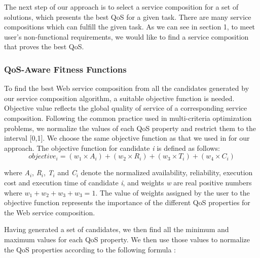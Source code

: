 The next step of our approach is to select a service composition for a set of solutions, which presents the best QoS for a given task. There are many service compositions which can fulfill the given task. As we can see in section 1, to meet  user's non-functional requirements, we would like to find a service composition that proves the best QoS.

\subsubsection {QoS-Aware Fitness Functions}

To find the best Web service composition from all the candidates generated by our service composition algorithm, a suitable objective function is needed. Objective value reflects the global quality of service of a corresponding service composition. Following the common practice \cite{4,14,19} used in multi-criteria optimization problems, we normalize the values of each QoS property and restrict them to the interval [0,1]. We choose the same objective function as that we used in \cite{4,19} for our approach. The objective function for candidate \emph{i} is defined as follows:
\begin{equation}
objective_{i}=(w_{1} \times A_{i}) + (w_{2} \times R_{i}) + (w_{3} \times T_{i}) + (w_{4} \times C_{i})
\end{equation}

where \emph{A$_{i}$}, \emph{R$_{i}$}, \emph{T$_{i}$} and  \emph{C$_{i}$} denote the normalized availability, reliability,  execution cost and  execution time of candidate \emph{i}, and weights \emph{w} are real positive numbers where $w_{1} + w_{2} + w_{3} + w_{3} = 1$. The value of weights assigned by the user to the objective function represents the importance of the different QoS properties for the Web service composition. \par

Having generated a set of candidates, we then find all the minimum and maximum values for each QoS property. We then use those values to normalize the QoS properties according to the following formula \cite{4}:


